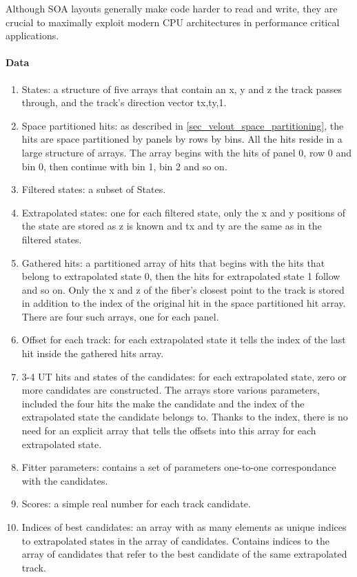 \documentclass[12pt]{article}
\begin{document}
Although SOA layouts generally make code harder to read and write, they are crucial to maximally exploit modern CPU architectures in performance critical applications.

\paragraph{Data} \mbox{}\vspace{0.4pc}

\begin{enumerate}
	\item States: a structure of five arrays that contain an x, y and z the track passes through, and the track's direction vector tx,ty,1.
	\item Space partitioned hits: as described in \ref{sec_velout_space_partitioning}, the hits are space partitioned by panels by rows by bins. All the hits reside in a large structure of arrays. The array begins with the hits of panel 0, row 0 and bin 0, then continue with bin 1, bin 2 and so on.
	\item Filtered states: a subset of States.
	\item Extrapolated states: one for each filtered state, only the x and y positions of the state are stored as z is known and tx and ty are the same as in the filtered states.
	\item Gathered hits: a partitioned array of hits that begins with the hits that belong to extrapolated state 0, then the hits for extrapolated state 1 follow and so on. Only the x and z of the fiber's closest point to the track is stored in addition to the index of the original hit in the space partitioned hit array. There are four such arrays, one for each panel.
	\item Offset for each track: for each extrapolated state it tells the index of the last hit inside the gathered hits array.
	\item 3-4 UT hits and states of the candidates: for each extrapolated state, zero or more candidates are constructed. The arrays store various parameters, included the four hits the make the candidate and the index of the extrapolated state the candidate belongs to. Thanks to the index, there is no need for an explicit array that tells the offsets into this array for each extrapolated state.
	\item Fitter parameters: contains a set of parameters one-to-one correspondance with the candidates.
	\item Scores: a simple real number for each track candidate.
	\item Indices of best candidates: an array with as many elements as unique indices to extrapolated states in the array of candidates. Contains indices to the array of candidates that refer to the best candidate of the same extrapolated track.
\end{enumerate}
\end{document}
